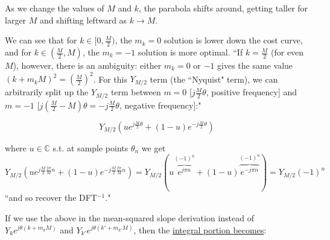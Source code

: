 \documentclass[10pt]{article}
\begin{document}
\begin{center}
\end{center}

As we change the values of $M$ and $k$, the parabola shifts around, getting taller for larger $M$ and shifting leftward as $k \rightarrow M$.

We can see that for $k \in [0, \frac{M}{2})$, the $m_k = 0$ solution is lower down the cost curve, and for $k \in (\frac{M}{2}, M)$, the $m_k = -1$ solution is more optimal. ``If $k = \frac{M}{2}$ (for even $M$), however, there is an ambiguity: either $m_k = 0$ or $-1$ gives the same value $(k + m_k M)^2 = (\frac{M}{2})^2$. For this $Y_{M/2}$ term (the ``Nyquist" term), we can arbitrarily split up the $Y_{M/2}$ term between $m = 0$ [$j\frac{M}{2}\theta$, positive frequency] and $m = -1$ [$j(\frac{M}{2} - M)\theta = -j\frac{M}{2}\theta$, negative frequency]:"

$$Y_{M/2}(ue^{j\frac{M}{2}\theta} + (1 - u)e^{-j\frac{M}{2}\theta})$$\vspace{-7mm}

where $u \in \mathbb{C}$ s.t. at sample points $\theta_n$ we get $Y_{M/2}(ue^{j\frac{M}{2}\frac{2\pi}{M}n} + (1-u)e^{-j\frac{M}{2}\frac{2\pi}{M}n}) = Y_{M/2}(u\overbrace{e^{j\pi n}}^{(-1)^n} + (1-u)\overbrace{e^{-j\pi n}}^{(-1)^n}) = Y_{M/2}(-1)^n$ ``and so recover the DFT$^{-1}$."

If we use the above in the mean-squared slope derivation instead of $Y_k e^{j \theta (k + m_k M)}$ and $Y_{k'} e^{j \theta (k' + m_{k'} M)}$, then the \href{https://math.stackexchange.com/a/5013632/278341}{integral portion becomes}:\vspace{-5mm}
\end{document}
